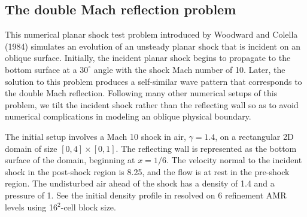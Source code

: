 % 




\subsection{The double Mach reflection problem}
This numerical planar shock test problem introduced by Woodward and Colella (1984)
simulates an evolution of an unsteady planar shock
that is incident on an oblique surface. 
Initially, the incident planar shock begins to propagate
to the bottom surface at a $30^{\circ}$ angle with the shock Mach number of 10. 
Later, the solution to this problem produces a self-similar wave pattern that corresponds to the double Mach reflection.
Following many other numerical setups of this problem, 
we tilt the incident shock rather than the reflecting wall so as to avoid numerical complications in modeling
an oblique physical boundary. 

The initial setup involves a Mach 10 shock in air, $\gamma = 1.4$, on a rectangular 2D domain of size
$[0,4]\times[0,1]$. The reflecting wall is represented as the bottom surface of the domain, beginning at $x=1/6$.
The velocity normal to the incident shock in the post-shock region is 8.25, and the flow is at rest in the pre-shock region.
The undisturbed air ahead of the shock has a density of 1.4 and a pressure of 1. 
See the initial density profile in  resolved on 6 refinement AMR levels using {16$^2$}-cell block size.

